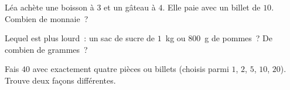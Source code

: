 \begin{exercise}[$\star$]\label{exo:g2:measure:8}
Léa achète une boisson à $3$ et un gâteau à $4$. Elle paie
avec un billet de $10$. Combien de monnaie~?
\end{exercise}

\begin{exercise}[$\star$]\label{exo:g2:measure:9}
Lequel est plus lourd~: un sac de sucre de $1$~kg ou $800$~g de
pommes~? De combien de grammes~?
\end{exercise}

\begin{exercise}[$\star\star$]\label{exo:g2:measure:10}
Fais $40$ avec exactement quatre pièces ou billets (choisis parmi
$1$, $2$, $5$, $10$, $20$). Trouve deux façons différentes.
\end{exercise}
